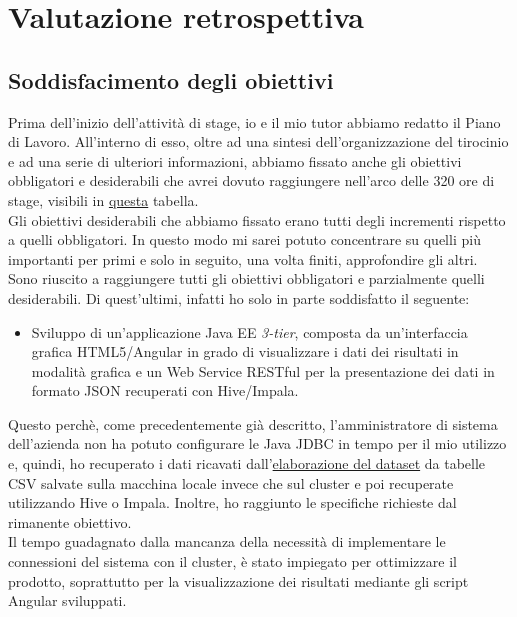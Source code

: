 
\chapter{Valutazione retrospettiva}
\label{cap:valutazione-retrospettiva}

\section{Soddisfacimento degli obiettivi}
Prima dell'inizio dell'attività di stage, io e il mio tutor abbiamo redatto il Piano di Lavoro. All'interno di esso, oltre ad una sintesi dell'organizzazione del tirocinio e ad una serie di ulteriori informazioni, abbiamo fissato anche gli obiettivi obbligatori e desiderabili che avrei dovuto raggiungere nell'arco delle 320 ore di stage, visibili in \hyperref[obiettivi_stage]{questa} tabella.\\
Gli obiettivi desiderabili che abbiamo fissato erano tutti degli incrementi rispetto a quelli obbligatori. In questo modo mi sarei potuto concentrare su quelli più importanti per primi e solo in seguito, una volta finiti, approfondire gli altri.\\ 
Sono riuscito a raggiungere tutti gli obiettivi obbligatori e parzialmente quelli desiderabili. Di quest'ultimi, infatti ho solo in parte soddisfatto il seguente:
\begin{itemize}
	\item Sviluppo di un'applicazione Java EE \textit{3-tier}, composta da un'interfaccia grafica HTML5/Angular in grado di visualizzare i dati dei risultati in modalità grafica e un Web Service RESTful per la presentazione dei dati in formato JSON recuperati con Hive/Impala.
\end{itemize}
Questo perchè, come precedentemente già descritto, l'amministratore di sistema dell'azienda non ha potuto configurare le \gls{Java JDBC} in tempo per il mio utilizzo e, quindi, ho recuperato i dati ricavati dall'\hyperref[dataset]{elaborazione del dataset} da tabelle \gls{CSV} salvate sulla macchina locale invece che sul \gls{cluster} e poi recuperate utilizzando Hive o Impala. Inoltre, ho raggiunto le specifiche richieste dal rimanente obiettivo. \\
Il tempo guadagnato dalla mancanza della necessità di implementare le connessioni del sistema con il \gls{cluster}, è stato impiegato per ottimizzare il prodotto, soprattutto per la visualizzazione dei risultati mediante gli script Angular sviluppati.

